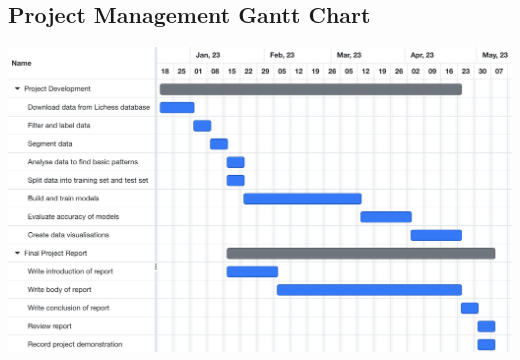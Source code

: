 \documentclass[%
 superscriptaddress,
showpacs,preprintnumbers,
 amsmath,
 amssymb,
 aps,
 pra,
showkeys,
onecolumn,
notitlepage,
11pt,
tightenlines      %
]{revtex4-1}
\begin{document}
\begin{appendices}
    \section{Project Management Gantt Chart}
    \begin{center}
        \includegraphics[width=1\textwidth]{images/Gantt Chart - Project Management.png}
    \end{center}
\end{appendices}
\end{document}

